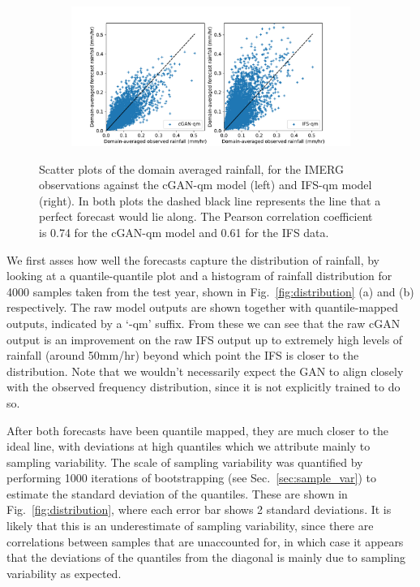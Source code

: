 \documentclass{article}
\begin{document}
\begin{figure}
\centering
     \begin{subfigure}{\textwidth}
    \centering
     \includegraphics[width=\textwidth]{images/scatter_mean_final-nologs_217600.pdf}
     \caption{}
     \end{subfigure}
     \caption{Scatter plots of the domain averaged rainfall, for the IMERG observations against the cGAN-qm model (left) and IFS-qm model (right). In both plots the dashed black line represents the line that a perfect forecast would lie along. The Pearson correlation coefficient is 0.74 for the cGAN-qm model and 0.61 for the IFS data.}
     \label{fig:bias}
\end{figure}

 We first asses how well the forecasts capture the distribution of rainfall, by looking at a quantile-quantile plot and a histogram of rainfall distribution for 4000 samples taken from the test year, shown in Fig.~\ref{fig:distribution} (a) and (b) respectively. The raw model outputs are shown together with quantile-mapped outputs, indicated by a `-qm' suffix. From these we can see that the raw cGAN output is an improvement on the raw IFS output up to extremely high levels of rainfall (around 50mm/hr) beyond which point the IFS is closer to the distribution. Note that we wouldn't necessarily expect the GAN to align closely with the observed frequency distribution, since it is not explicitly trained to do so.

After both forecasts have been quantile mapped, they are much closer to the ideal line, with deviations at high quantiles which we attribute mainly to sampling variability. The scale of sampling variability was quantified by performing 1000 iterations of bootstrapping (see Sec.~\ref{sec:sample_var}) to estimate the standard deviation of the quantiles. These are shown in Fig.~\ref{fig:distribution}, where each error bar shows 2 standard deviations. It is likely that this is an underestimate of sampling variability, since there are correlations between samples that are unaccounted for, in which case it appears that the deviations of the quantiles from the diagonal is mainly due to sampling variability as expected. 
\end{document}
